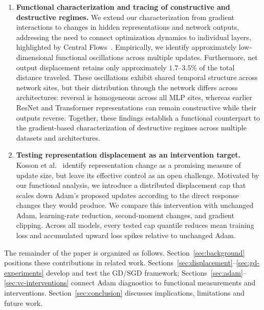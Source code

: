\begin{enumerate}
\item \textbf{Functional characterization and tracing of constructive and destructive regimes.} We extend our characterization from gradient interactions to changes in hidden representations and network outputs, addressing the need to connect optimization dynamics to individual layers, highlighted by Central Flows~\cite{cohen2025central}. Empirically, we identify approximately low-dimensional functional oscillations across multiple updates. Furthermore, net output displacement retains only approximately \(1.7\)--\(3.5\%\) of the total distance traveled. These oscillations exhibit shared temporal structure across network sites, but their distribution through the network differs across architectures: reversal is homogeneous across all MLP sites, whereas earlier ResNet and Transformer representations can remain constructive while their outputs reverse. Together, these findings establish a functional counterpart to the gradient-based characterization of destructive regimes across multiple datasets and architectures.

\item \textbf{Testing representation displacement as an intervention target.} Kosson et al.~\cite{kosson2024warmup} identify representation change as a promising measure of update size, but leave its effective control as an open challenge. Motivated by our functional analysis, we introduce a distributed displacement cap that scales down Adam's proposed updates according to the direct response changes they would produce. We compare this intervention with unchanged Adam, learning-rate reduction, second-moment changes, and gradient clipping. Across all models, every tested cap quantile reduces mean training loss and accumulated upward loss spikes relative to unchanged Adam. 

\end{enumerate}

The remainder of the paper is organized as follows. Section~\ref{sec:background} positions these contributions in related work. Sections~\ref{sec:displacement}--\ref{sec:gd-experiments} develop and test the GD/SGD framework; Sections~\ref{sec:adam}--\ref{sec:vc-interventions} connect Adam diagnostics to functional measurements and interventions. Section~\ref{sec:conclusion} discusses implications, limitations and future work.